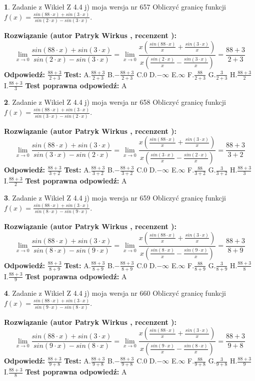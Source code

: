 \documentclass[12pt, a4paper]{article}
\theoremstyle{definition} %
\newtheorem{zad}{}
\newcommand{\zadStart}[1]{\begin{zad}#1\newline}
\newcommand{\zadStop}{\end{zad}}
\newcommand{\rozwStart}[2]{\noindent \textbf{Rozwiązanie (autor #1 , recenzent #2): }\newline}
\newcommand{\rozwStop}{\newline}
\newcommand{\odpStart}{\noindent \textbf{Odpowiedź:}\newline}
\newcommand{\odpStop}{\newline}
\newcommand{\testStart}{\noindent \textbf{Test:}\newline}
\newcommand{\testStop}{\newline}
\newcommand{\kluczStart}{\noindent \textbf{Test poprawna odpowiedź:}\newline}
\newcommand{\kluczStop}{\newline}
\begin{document}
\zadStart{Zadanie z Wikieł Z 4.4 j) moja wersja nr 657}
Obliczyć granicę funkcji $f(x)=\frac{sin(88\cdot x) +sin(3\cdot x)}{sin(2\cdot x) -sin(3\cdot x)}$.
\zadStop
\rozwStart{Patryk Wirkus}{}
$$\lim\limits_{x\to 0}\frac{sin(88\cdot x) +sin(3\cdot x)}{sin(2\cdot x) -sin(3\cdot x)}=\lim\limits_{x\to 0}\frac{x(\frac{sin(88\cdot x)}{x}+\frac{sin(3\cdot x)}{x})}{x(\frac{sin(2\cdot x)}{x}-\frac{sin(3\cdot x)}{x})}=\frac{88+3}{2+3}$$
\rozwStop
\odpStart
$\frac{88+3}{2+3}$
\odpStop
\testStart
A.$\frac{88+3}{2+3}$
B.$-\frac{88+3}{2+3}$
C.$0$
D.$-\infty$
E.$\infty$
F.$\frac{88}{2+3}$
G.$\frac{3}{2+3}$
H.$\frac{88+3}{2}$
I.$\frac{88+3}{3}$
\testStop
\kluczStart
A
\kluczStop



\zadStart{Zadanie z Wikieł Z 4.4 j) moja wersja nr 658}
Obliczyć granicę funkcji $f(x)=\frac{sin(88\cdot x) +sin(3\cdot x)}{sin(3\cdot x) -sin(2\cdot x)}$.
\zadStop
\rozwStart{Patryk Wirkus}{}
$$\lim\limits_{x\to 0}\frac{sin(88\cdot x) +sin(3\cdot x)}{sin(3\cdot x) -sin(2\cdot x)}=\lim\limits_{x\to 0}\frac{x(\frac{sin(88\cdot x)}{x}+\frac{sin(3\cdot x)}{x})}{x(\frac{sin(3\cdot x)}{x}-\frac{sin(2\cdot x)}{x})}=\frac{88+3}{3+2}$$
\rozwStop
\odpStart
$\frac{88+3}{3+2}$
\odpStop
\testStart
A.$\frac{88+3}{3+2}$
B.$-\frac{88+3}{3+2}$
C.$0$
D.$-\infty$
E.$\infty$
F.$\frac{88}{3+2}$
G.$\frac{3}{3+2}$
H.$\frac{88+3}{3}$
I.$\frac{88+3}{2}$
\testStop
\kluczStart
A
\kluczStop



\zadStart{Zadanie z Wikieł Z 4.4 j) moja wersja nr 659}
Obliczyć granicę funkcji $f(x)=\frac{sin(88\cdot x) +sin(3\cdot x)}{sin(8\cdot x) -sin(9\cdot x)}$.
\zadStop
\rozwStart{Patryk Wirkus}{}
$$\lim\limits_{x\to 0}\frac{sin(88\cdot x) +sin(3\cdot x)}{sin(8\cdot x) -sin(9\cdot x)}=\lim\limits_{x\to 0}\frac{x(\frac{sin(88\cdot x)}{x}+\frac{sin(3\cdot x)}{x})}{x(\frac{sin(8\cdot x)}{x}-\frac{sin(9\cdot x)}{x})}=\frac{88+3}{8+9}$$
\rozwStop
\odpStart
$\frac{88+3}{8+9}$
\odpStop
\testStart
A.$\frac{88+3}{8+9}$
B.$-\frac{88+3}{8+9}$
C.$0$
D.$-\infty$
E.$\infty$
F.$\frac{88}{8+9}$
G.$\frac{3}{8+9}$
H.$\frac{88+3}{8}$
I.$\frac{88+3}{9}$
\testStop
\kluczStart
A
\kluczStop



\zadStart{Zadanie z Wikieł Z 4.4 j) moja wersja nr 660}
Obliczyć granicę funkcji $f(x)=\frac{sin(88\cdot x) +sin(3\cdot x)}{sin(9\cdot x) -sin(8\cdot x)}$.
\zadStop
\rozwStart{Patryk Wirkus}{}
$$\lim\limits_{x\to 0}\frac{sin(88\cdot x) +sin(3\cdot x)}{sin(9\cdot x) -sin(8\cdot x)}=\lim\limits_{x\to 0}\frac{x(\frac{sin(88\cdot x)}{x}+\frac{sin(3\cdot x)}{x})}{x(\frac{sin(9\cdot x)}{x}-\frac{sin(8\cdot x)}{x})}=\frac{88+3}{9+8}$$
\rozwStop
\odpStart
$\frac{88+3}{9+8}$
\odpStop
\testStart
A.$\frac{88+3}{9+8}$
B.$-\frac{88+3}{9+8}$
C.$0$
D.$-\infty$
E.$\infty$
F.$\frac{88}{9+8}$
G.$\frac{3}{9+8}$
H.$\frac{88+3}{9}$
I.$\frac{88+3}{8}$
\testStop
\kluczStart
A
\kluczStop
\end{document}
